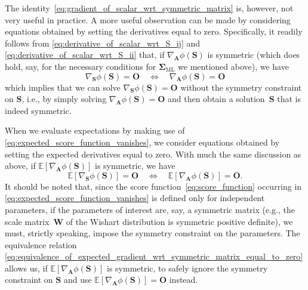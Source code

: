 \documentclass[12pt,a4paper]{article}
\begin{document}
The identity~\eqref{eq:gradient_of_scalar_wrt_symmetric_matrix} is, however, not very useful
in practice.
A more useful observation can be made by considering equations obtained by
setting the derivatives equal to zero.
Specifically, it readily follows from \eqref{eq:derivative_of_scalar_wrt_S_ij} and
\eqref{eq:derivative_of_scalar_wrt_S_ii} that,
if $\nabla_{\mathbf{A}} \phi(\mathbf{S})$ is symmetric
(which does hold, say,
for the necessary conditions for $\bm{\Sigma}_{\text{ML}}$ we mentioned above),
we have
\begin{equation}
\nabla_{\mathbf{S}} \phi(\mathbf{S}) = \mathbf{O}
\quad \Longleftrightarrow \quad
\nabla_{\mathbf{A}} \phi(\mathbf{S}) = \mathbf{O}
\end{equation}
which implies that we can solve $\nabla_{\mathbf{S}} \phi(\mathbf{S}) = \mathbf{O}$
without the symmetry constraint on $\mathbf{S}$, i.e.,
by simply solving $\nabla_{\mathbf{A}} \phi(\mathbf{S}) = \mathbf{O}$
and then obtain a solution~$\mathbf{S}$ that is indeed symmetric.

When we evaluate expectations by making use of \eqref{eq:expected_score_function_vanishes},
we consider equations obtained by setting the expected derivatives equal to zero.
With much the same discussion as above,
if $\mathbb{E}\left[\nabla_{\mathbf{A}} \phi(\mathbf{S})\right]$ is symmetric,
we have
\begin{equation}
\mathbb{E}\left[\nabla_{\mathbf{S}} \phi(\mathbf{S})\right] = \mathbf{O}
\quad \Longleftrightarrow \quad
\mathbb{E}\left[\nabla_{\mathbf{A}} \phi(\mathbf{S})\right] = \mathbf{O} .
\label{eq:equivalence_of_expected_gradient_wrt_symmetric_matrix_equal_to_zero}
\end{equation}
It should be noted that, since the score function~\eqref{eq:score_function}
occurring in \eqref{eq:expected_score_function_vanishes}
is defined only for independent parameters,
if the parameters of interest are, say, a symmetric matrix
(e.g., the scale matrix~$\mathbf{W}$ of the Wishart distribution is symmetric positive definite),
we must, strictly speaking, impose the symmetry constraint on the parameters.
The equivalence relation~%
\eqref{eq:equivalence_of_expected_gradient_wrt_symmetric_matrix_equal_to_zero}
allows us, if $\mathbb{E}\left[\nabla_{\mathbf{A}} \phi(\mathbf{S})\right]$ is symmetric,
to safely ignore the symmetry constraint on $\mathbf{S}$ and use
$\mathbb{E}\left[\nabla_{\mathbf{A}} \phi(\mathbf{S})\right] = \mathbf{O}$ instead.
\end{document}
